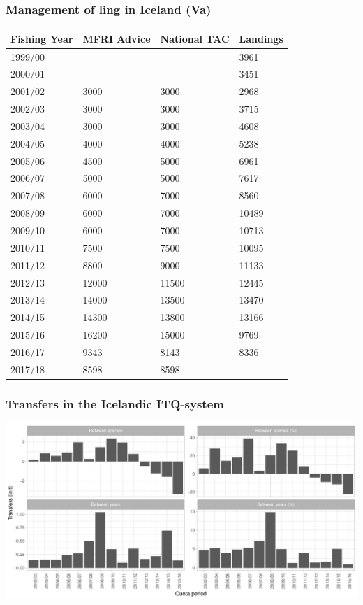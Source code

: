 \documentclass[sansserif]{beamer}\usepackage[]{graphicx}\usepackage[]{color}
\makeatletter
\def\maxwidth{ %
  \ifdim\Gin@nat@width>\linewidth
    \linewidth
  \else
    \Gin@nat@width
  \fi
}
\theoremstyle{example}
\makeatother
\begin{document}
 \begin{frame}
 \frametitle{Management of ling in Iceland (Va)}
 {\centering

\begin{tabular}{l|l|l|l}
\hline
Fishing Year & MFRI Advice & National TAC & Landings\\
\hline
1999/00 &  &  & 3961\\
\hline
2000/01 &  &  & 3451\\
\hline
2001/02 & 3000 & 3000 & 2968\\
\hline
2002/03 & 3000 & 3000 & 3715\\
\hline
2003/04 & 3000 & 3000 & 4608\\
\hline
2004/05 & 4000 & 4000 & 5238\\
\hline
2005/06 & 4500 & 5000 & 6961\\
\hline
2006/07 & 5000 & 5000 & 7617\\
\hline
2007/08 & 6000 & 7000 & 8560\\
\hline
2008/09 & 6000 & 7000 & 10489\\
\hline
2009/10 & 6000 & 7000 & 10713\\
\hline
2010/11 & 7500 & 7500 & 10095\\
\hline
2011/12 & 8800 & 9000 & 11133\\
\hline
2012/13 & 12000 & 11500 & 12445\\
\hline
2013/14 & 14000 & 13500 & 13470\\
\hline
2014/15 & 14300 & 13800 & 13166\\
\hline
2015/16 & 16200 & 15000 & 9769\\
\hline
2016/17 & 9343 & 8143 & 8336\\
\hline
2017/18 & 8598 & 8598 & \\
\hline
\end{tabular}


\par}
\end{frame}

\begin{frame}
\frametitle{Transfers in the Icelandic ITQ-system}


\includegraphics[width=\maxwidth]{figure/transfplot-1} 


\end{frame}
\end{document}
